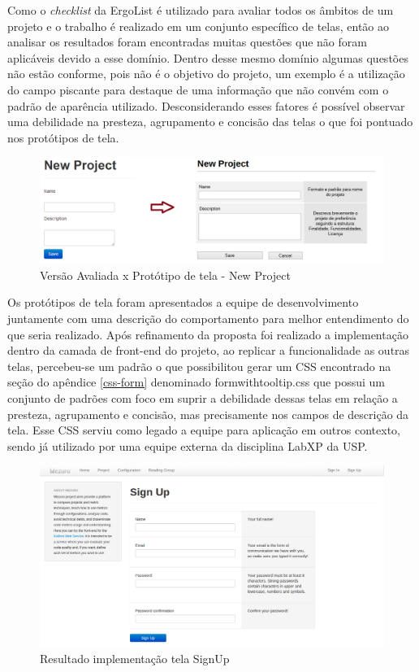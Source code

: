 Como o \textit{checklist} da ErgoList é utilizado para avaliar todos os âmbitos de um projeto e o trabalho é realizado em um conjunto específico de telas, então ao analisar os resultados foram encontradas muitas questões que não foram aplicáveis devido a esse domínio. Dentro desse mesmo domínio algumas questões não estão conforme, pois não é o objetivo do projeto, um exemplo é a utilização do campo piscante para destaque de uma informação que não convém com o padrão de aparência utilizado. Desconsiderando esses fatores é possível observar uma debilidade na presteza, agrupamento e concisão das telas o que foi pontuado nos protótipos de tela.

\graphicspath{{figuras/}}
\begin{figure}[h]
\centering
\includegraphics[width=1.0\textwidth]{PrototipoNewProject}
\caption{Versão Avaliada x Protótipo de tela - New Project}
\label{parallel-coordinate}
\end{figure}

Os protótipos de tela foram apresentados a equipe de desenvolvimento juntamente com uma descrição do comportamento para melhor entendimento do que seria realizado. Após refinamento da proposta foi realizado a implementação dentro da camada de front-end do projeto, ao replicar a funcionalidade as outras telas, percebeu-se um padrão o que possibilitou gerar um CSS encontrado na seção do apêndice \ref{css-form} denominado formwithtooltip.css que possui um conjunto de padrões com foco em suprir a debilidade dessas telas em relação a presteza, agrupamento e concisão, mas precisamente nos campos de descrição da tela. Esse CSS serviu como legado a equipe para aplicação em outros contexto, sendo já utilizado por uma equipe externa da disciplina LabXP da USP.

\graphicspath{{figuras/}}
\begin{figure}[h]
\centering
\includegraphics[width=1.0\textwidth]{TelaSignUp}
\caption{Resultado implementação tela SignUp}
\label{parallel-coordinate}
\end{figure}

